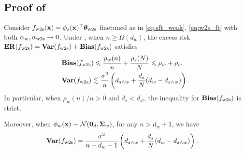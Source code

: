 \subsection{Proof of }\label{apx:pf_w2s_ft}

\begin{theorem}\label{thm:w2s_ft_formal}
    Consider $f_{\mathrm{w2s}}(\mathbf{x}) = \phi_s(\mathbf{x})^\top \boldsymbol{\theta}_{\mathrm{w2s}}$ finetuned as in \eqref{eq:sft_weak}, \eqref{eq:w2s_ft} with both $\alpha_w, \alpha_{\mathrm{w2s}} \to 0$. Under , when $n \ge \Omega(d_w)$, the excess risk $\mathbf{ER}(f_{\mathrm{w2s}}) = \mathbf{Var}(f_{\mathrm{w2s}}) + \mathbf{Bias}(f_{\mathrm{w2s}})$ satisfies
    \begin{align*}
        &\mathbf{Bias}(f_{\mathrm{w2s}}) \leqslant \frac{\rho_w(n)}{n} + \frac{\rho_s(N)}{N} \leqslant \rho_w + \rho_s, \\
        &\mathbf{Var}(f_{\mathrm{w2s}}) \lesssim \frac{\sigma^2}{n} \left(d_{s \wedge w} + \frac{d_s}{N} (d_w - d_{s \wedge w})\right).
    \end{align*}
    In particular, when ${\rho_w(n)}/{n} > 0$ and $d_s < d_w$, the inequality for $\mathbf{Bias}(f_{\mathrm{w2s}})$ is strict.

    Moreover, when $\phi_w(\mathbf{x}) \sim \mathcal{N}(\textbf0_d, \boldsymbol{\Sigma}_w)$, for any $n > d_w + 1$, we have 
    \begin{align*}
        &\mathbf{Var}(f_{\mathrm{w2s}}) = \frac{\sigma^2}{n-d_w-1} \left(d_{s \wedge w} + \frac{d_s}{N} (d_w - d_{s \wedge w})\right).
    \end{align*}
\end{theorem}

